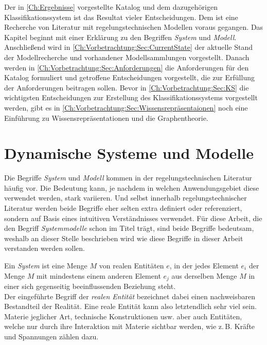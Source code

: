 Der in \ref{Ch:Ergebnisse} vorgestellte Katalog und dem dazugehörigen Klassifikationssystem ist das Resultat vieler Entscheidungen. Dem ist eine Recherche von Literatur mit regelungstechnischen Modellen voraus gegangen. Das Kapitel beginnt mit einer Erklärung zu den Begriffen \textit{System} und \textit{Modell}. Anschließend wird in \ref{Ch:Vorbetrachtung:Sec:CurrentState} der aktuelle Stand der Modellrecherche und vorhandener Modellsammlungen vorgestellt. Danach werden in \ref{Ch:Vorbetrachtung:Sec:Anforderungen} die Anforderungen für den Katalog formuliert und getroffene Entscheidungen vorgestellt, die zur Erfüllung der Anforderungen beitragen sollen. Bevor in \ref{Ch:Vorbetrachtung:Sec:KS} die wichtigsten Entscheidungen zur Erstellung des Klassifikationssystems vorgestellt werden, gibt es in \ref{Ch:Vorbetrachtung:Sec:Wissensrepräsentaionen} noch eine Einführung zu Wissensrepräsentationen und die Graphentheorie.   

\section{Dynamische Systeme und Modelle}
\label{Ch:Vorbetrachtung:Sec:SystemeModelle}
Die Begriffe \textit{System} und \textit{Modell} kommen in der regelungstechnischen Literatur häufig vor. Die Bedeutung kann, je nachdem in welchen Anwendungsgebiet diese verwendet werden, stark variieren. Und selbst innerhalb regelungstechnischer Literatur werden beide Begriffe eher selten extra definiert oder referenziert, sondern auf Basis eines intuitiven Verständnisses verwendet. Für diese Arbeit, die den Begriff \textit{Systemmodelle} schon im Titel trägt, sind beide Begriffe bedeutsam, weshalb an dieser Stelle beschrieben wird wie diese Begriffe in dieser Arbeit verstanden werden sollen. 

Ein \textit{System} ist eine Menge $M$ von realen Entitäten $e$, in der jedes Element $e_i$ der Menge $M$ mit mindestens einem anderen Element $e_j$ aus derselben Menge $M$ in einer sich gegenseitig beeinflussenden Beziehung steht.\\ %
Der eingeführte Begriff der \textit{realen Entität} bezeichnet dabei einen nachweisbaren Bestandteil der Realität. Eine reale Entität kann also letztendlich sehr viel sein. Materie jeglicher Art, technische Konstruktionen usw. aber auch Entitäten, welche nur durch ihre Interaktion mit Materie sichtbar werden, wie z.\,B. Kräfte und Spannungen zählen dazu. 

